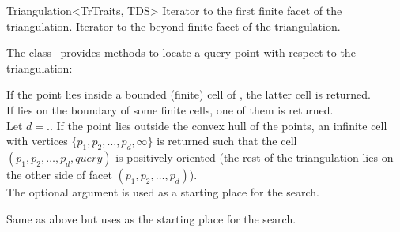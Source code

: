 \begin{ccRefClass}{Triangulation<TrTraits, TDS>}
{Iterator to the first finite facet of the triangulation.}
\ccGlue
{}
{Iterator to the beyond finite facet of the triangulation.}


The class \ccRefName\ provides methods to locate a query point with respect to
the triangulation:

{If the point  lies inside a bounded (finite) cell of \ccVar,
the latter cell is returned.\\
If  lies on the boundary of some finite cells, one of them
is returned.\\
Let $d=$\ccVar.. If the point  lies
outside the convex hull of the points, an infinite cell with vertices $\{
p_1, p_2, \ldots, p_d, \infty\}$ is returned such that the cell $(p_1, p_2,
\ldots, p_d, query)$ is positively oriented (the rest of the triangulation lies
on the other side of facet $(p_1, p_2, \ldots, p_d)$).\\
The optional argument  is used as a starting place for the search.}

{Same as above but uses  as the starting place for the search.}


\end{ccRefClass}
